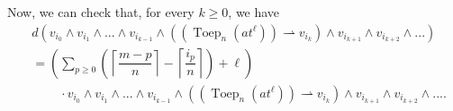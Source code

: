 \documentclass[etingof-lie.tex]{subfiles}
\begin{document}
Now, we can check that, for every $k\geq0$, we have%
\begin{align}
&  d\left(  v_{i_{0}}\wedge v_{i_{1}}\wedge...\wedge v_{i_{k-1}}\wedge\left(
\left(  \operatorname*{Toep}\nolimits_{n}\left(  at^{\ell}\right)  \right)
\rightharpoonup v_{i_{k}}\right)  \wedge v_{i_{k+1}}\wedge v_{i_{k+2}}%
\wedge...\right) \nonumber\\
&  =\left(  \sum\limits_{p\geq0}\left(  \left\lceil \dfrac{m-p}{n}\right\rceil
-\left\lceil \dfrac{i_{p}}{n}\right\rceil \right)  +\ell\right) \nonumber\\
&  \ \ \ \ \ \ \ \ \ \ \cdot v_{i_{0}}\wedge v_{i_{1}}\wedge...\wedge
v_{i_{k-1}}\wedge\left(  \left(  \operatorname*{Toep}\nolimits_{n}\left(
at^{\ell}\right)  \right)  \rightharpoonup v_{i_{k}}\right)  \wedge
v_{i_{k+1}}\wedge v_{i_{k+2}}\wedge.... \label{pf.glwave.F.4a}%
\end{align}
\end{document}
